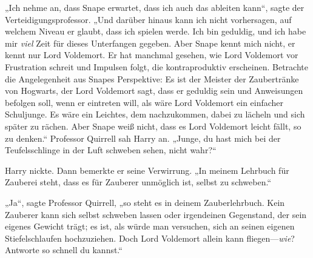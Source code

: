 „Ich nehme an, dass Snape erwartet, dass ich auch das ableiten kann“, sagte der Verteidigungsprofessor. „Und darüber hinaus kann ich nicht vorhersagen, auf welchem Niveau er glaubt, dass ich spielen werde. Ich bin geduldig, und ich habe mir \emph{viel} Zeit für dieses Unterfangen gegeben. Aber Snape kennt mich nicht, er kennt nur Lord Voldemort. Er hat manchmal gesehen, wie Lord Voldemort vor Frustration schreit und Impulsen folgt, die kontraproduktiv erscheinen. Betrachte die Angelegenheit aus Snapes Perspektive: Es ist der Meister der Zaubertränke von Hogwarts, der Lord Voldemort sagt, dass er geduldig sein und Anweisungen befolgen soll, wenn er eintreten will, als wäre Lord Voldemort ein einfacher Schuljunge. Es wäre ein Leichtes, dem nachzukommen, dabei zu lächeln und sich später zu rächen. Aber Snape weiß nicht, dass es Lord Voldemort leicht fällt, so zu denken.“
Professor Quirrell sah Harry an.
„Junge, du hast mich bei der Teufelsschlinge in der Luft schweben sehen, nicht wahr?“

Harry nickte.
Dann bemerkte er seine Verwirrung.
„In meinem Lehrbuch für Zauberei steht, dass es für Zauberer unmöglich ist, selbst zu schweben.“

„Ja“, sagte Professor Quirrell, „so steht es in deinem Zauberlehrbuch. Kein Zauberer kann sich selbst schweben lassen oder irgendeinen Gegenstand, der sein eigenes Gewicht trägt; es ist, als würde man versuchen, sich an seinen eigenen Stiefelschlaufen hochzuziehen. Doch Lord Voldemort allein kann fliegen—\emph{wie}? Antworte so schnell du kannst.“

